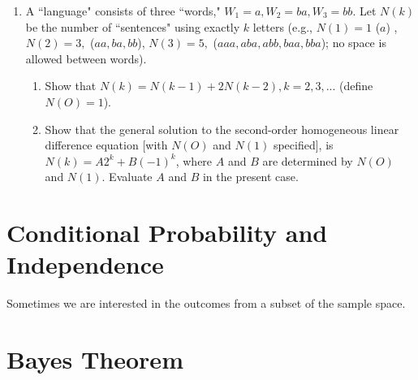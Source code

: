 \documentclass[../main.tex]{subfiles}
\begin{document}
\begin{enumerate}
	\item  A ``language" consists of three ``words," 
	$W_1 =a, W_2 = ba, W_3 = bb$. Let
	$N(k)$ be the number of ``sentences" using exactly $k$ letters (e.g., $N(1) = 1$ ($a$)
	, $N(2) = 3,$ ($aa, ba, bb$), $N(3) =5,$ ($aaa, aba, abb, baa, bba$); no space is
	allowed between words).
	\begin{enumerate}
	\item Show that $N(k) = N(k - 1) + 2N(k - 2), k =2,3,...$ (define $N(O) =1$).
	\item Show that the general solution to the second-order homogeneous linear
	difference equation 
	[with $N(O)$ and $N(1)$ specified], is $N(k) = A2^k +
	B(-1)^k$, where $A$ and $B$ are determined by $N(O)$ and $N(1)$. Evaluate $A$
	and $B$ in the present case.
	\end{enumerate}	

	
\end{enumerate}
\section{Conditional Probability and Independence}
Sometimes we are interested in the outcomes from a subset of the
sample space.


\section{Bayes Theorem}
\end{document}
